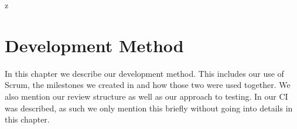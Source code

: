 z\chapter{Development Method}\label{cha:development_method}
In this chapter we describe our development method.
This includes our use of Scrum, the milestones we created in  and how those two were used together.
We also mention our review structure as well as our approach to testing.
In  our \ac{CI} was described, as such we only mention this briefly without going into details in this chapter.





